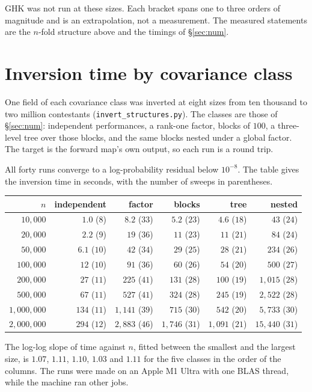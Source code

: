 \documentclass[11pt]{article}
\begin{document}
GHK was not run at these sizes. Each bracket spans one to three orders
of magnitude and is an extrapolation, not a measurement. The measured
statements are the $n$-fold structure above and the timings of
\S\ref{sec:num}.

\section{Inversion time by covariance class}\label{app:scaling}

One field of each covariance class was inverted at eight sizes from ten
thousand to two million contestants (\texttt{invert\_structures.py}).
The classes are those of \S\ref{sec:num}: independent performances, a
rank-one factor, blocks of $100$, a three-level tree over those blocks,
and the same blocks nested under a global factor. The target is the
forward map's own output, so each run is a round trip.

All forty runs converge to a log-probability residual below $10^{-8}$.
The table gives the inversion time in seconds, with the number of sweeps
in parentheses.

\begin{center}\small
\begin{tabular}{rrrrrr}
\toprule
$n$ & independent & factor & blocks & tree & nested \\
\midrule
$10{,}000$ & $1.0$ ($8$) & $8.2$ ($33$) & $5.2$ ($23$) & $4.6$ ($18$) & $43$ ($24$) \\
$20{,}000$ & $2.2$ ($9$) & $19$ ($36$) & $11$ ($23$) & $11$ ($21$) & $84$ ($24$) \\
$50{,}000$ & $6.1$ ($10$) & $42$ ($34$) & $29$ ($25$) & $28$ ($21$) & $234$ ($26$) \\
$100{,}000$ & $12$ ($10$) & $91$ ($36$) & $60$ ($26$) & $54$ ($20$) & $500$ ($27$) \\
$200{,}000$ & $27$ ($11$) & $225$ ($41$) & $131$ ($28$) & $100$ ($19$) & $1{,}015$ ($28$) \\
$500{,}000$ & $67$ ($11$) & $527$ ($41$) & $324$ ($28$) & $245$ ($19$) & $2{,}522$ ($28$) \\
$1{,}000{,}000$ & $134$ ($11$) & $1{,}141$ ($39$) & $715$ ($30$) & $542$ ($20$) & $5{,}733$ ($30$) \\
$2{,}000{,}000$ & $294$ ($12$) & $2{,}883$ ($46$) & $1{,}746$ ($31$) & $1{,}091$ ($21$) & $15{,}440$ ($31$) \\
\bottomrule
\end{tabular}
\end{center}

The log-log slope of time against $n$, fitted between the smallest and
the largest size, is $1.07$, $1.11$, $1.10$, $1.03$ and $1.11$ for the five classes in the order of the
columns. The runs were made on an Apple M1 Ultra with one BLAS thread, while the machine ran other jobs.
\end{document}
